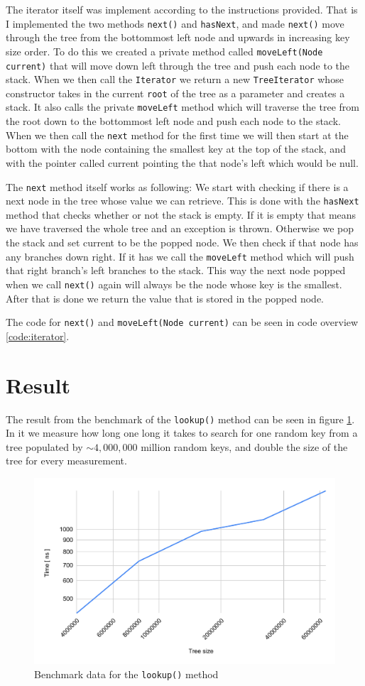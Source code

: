 \documentclass[a4paper,11pt]{article}
\begin{document}
The iterator itself was implement according to the instructions provided. That is I implemented
the two methods {\tt next()} and {\tt hasNext}, and made {\tt next()} move through the tree
from the bottommost left node and upwards in increasing key size order. To do this we
created a private method called {\tt moveLeft(Node current)} that will move down left
through the tree and push each node to the stack. When we then call the {\tt Iterator}
we return a new {\tt TreeIterator} whose constructor takes in the current {\tt root} of
the tree as a parameter and creates a stack. It also calls the private {\tt moveLeft}
method which will traverse the tree from the root down to the bottommost left node and
push each node to the stack. When we then call the {\tt next} method for the first time
we will then start at the bottom with the node containing the smallest key at the top of
the stack, and with the pointer called current pointing the that node's left which would
be null.

The {\tt next} method itself works as following: We start with checking if there is a next node
in the tree whose value we can retrieve. This is done with the {\tt hasNext} method that
checks whether or not the stack is empty. If it is empty that means we have traversed the
whole tree and an exception is thrown. Otherwise we pop the stack and set current to
be the popped node. We then check if that node has any branches down right. If it has we
call the {\tt moveLeft} method which will push that right branch's left branches to the
stack. This way the next node popped when we call {\tt next()} again will always be the
node whose key is the smallest. After that is done we return the value that is stored in the
popped node.

The code for {\tt next()} and {\tt moveLeft(Node current)} can be seen in code overview
\ref{code:iterator}.


\section{Result}
The result from the benchmark of the {\tt lookup()} method can be seen in figure \ref{fig:bench}.
In it we measure how long one long it takes to search for one random key from a tree
populated by $\sim4,000,000$ million random keys, and double the size of the tree for every measurement.
\begin{figure}[h!]
    \centering
    \includegraphics[width=.8\textwidth]{benchmarkData.pdf}
    \caption{Benchmark data for the {\tt lookup()} method}
    \label{fig:bench}
\end{figure}
\newpage
\end{document}
